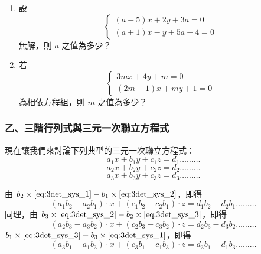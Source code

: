 \begin{enumerate}[1.]
\begin{equation*}
  \begin{cases}
    2x+3y = 5 \\
    4x+ay = 7
  \end{cases}
  \end{equation*}
  \item 設
  \begin{equation*}
  \begin{cases}
    (a-5)x + 2y + 3a = 0 \\
    (a+1)x - y + 5a - 4 = 0
  \end{cases}
  \end{equation*}
  無解，則 $a$ 之值為多少？
  \item 若
  \begin{equation*}
  \begin{cases}
    3mx + 4y + m = 0 \\
    (2m-1)x + my + 1 = 0
  \end{cases}
  \end{equation*}
  為相依方程組，則 $m$ 之值為多少？
\end{enumerate}

\subsubsection*{乙、三階行列式與三元一次聯立方程式}\label{subsec:4-4-b}

現在讓我們來討論下列典型的三元一次聯立方程式：
\begin{equation}\label{eq:3det_sys_1}
  a_1 x + b_1 y + c_1 z = d_1 \dots\dots\dots
\end{equation}
\begin{equation}\label{eq:3det_sys_2}
  a_2 x + b_2 y + c_2 z = d_2 \dots\dots\dots
\end{equation}
\begin{equation}\label{eq:3det_sys_3}
  a_3 x + b_3 y + c_3 z = d_3 \dots\dots\dots
\end{equation}

由 $b_2 \times \eqref{eq:3det_sys_1} - b_1 \times \eqref{eq:3det_sys_2}$，即得
\begin{equation}\label{eq:3det_elim_1}
  (a_1 b_2 - a_2 b_1) \cdot x + (c_1 b_2 - c_2 b_1) \cdot z = d_1 b_2 - d_2 b_1 \dots\dots\dots
\end{equation}
同理，由 $b_3 \times \eqref{eq:3det_sys_2} - b_2 \times \eqref{eq:3det_sys_3}$，即得
\begin{equation}\label{eq:3det_elim_2}
  (a_2 b_3 - a_3 b_2) \cdot x + (c_2 b_3 - c_3 b_2) \cdot z = d_2 b_3 - d_3 b_2 \dots\dots\dots
\end{equation}
$b_1 \times \eqref{eq:3det_sys_3} - b_3 \times \eqref{eq:3det_sys_1}$，即得
\begin{equation}\label{eq:3det_elim_3}
  (a_3 b_1 - a_1 b_3) \cdot x + (c_3 b_1 - c_1 b_3) \cdot z = d_3 b_1 - d_1 b_3 \dots\dots\dots
\end{equation}

